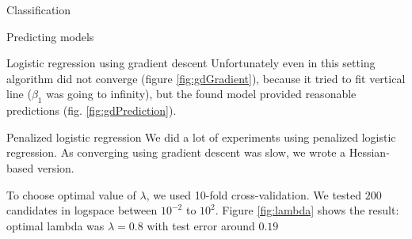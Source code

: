 \documentclass{article}
\begin{document}
\begin{section}{Classification}
\begin{subsection}{Predicting models}
\begin{subsubsection}{Logistic regression using gradient descent}
Unfortunately even in this setting algorithm did not converge (figure \ref{fig:gdGradient}), because it tried to fit vertical line ($\beta_1$ was going to infinity), but the found model provided reasonable predictions (fig. \ref{fig:gdPrediction}).
\begin{figure}[!t]
\center

\hfill
{}
\caption{}
\end{figure}
\end{subsubsection}
\begin{subsubsection}{Penalized logistic regression}
We did a lot of experiments using penalized logistic regression. As converging using gradient descent was slow, we wrote a Hessian-based version. 

To choose optimal value of $\lambda$, we used 10-fold cross-validation. We tested $200$ candidates in logspace between $10^{-2}$ to $10^2$. Figure \ref{fig:lambda} shows the result: optimal lambda was $\lambda = 0.8$ with test error around $0.19$

\begin{figure}[!t]
\center


\end{figure}
\end{subsubsection}
\end{subsection}
\end{section}
\end{document}
